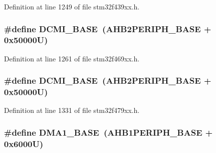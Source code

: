 Definition at line 1249 of file stm32f439xx.\+h.

\subsubsection[{\texorpdfstring{D\+C\+M\+I\+\_\+\+B\+A\+SE}{DCMI_BASE}}]{\setlength{\rightskip}{0pt plus 5cm}\#define D\+C\+M\+I\+\_\+\+B\+A\+SE~({\bf A\+H\+B2\+P\+E\+R\+I\+P\+H\+\_\+\+B\+A\+SE} + 0x50000\+U)}\hypertarget{group___peripheral__memory__map_ga55b794507e021135486de57129a2505c}{}\label{group___peripheral__memory__map_ga55b794507e021135486de57129a2505c}


Definition at line 1261 of file stm32f469xx.\+h.

\subsubsection[{\texorpdfstring{D\+C\+M\+I\+\_\+\+B\+A\+SE}{DCMI_BASE}}]{\setlength{\rightskip}{0pt plus 5cm}\#define D\+C\+M\+I\+\_\+\+B\+A\+SE~({\bf A\+H\+B2\+P\+E\+R\+I\+P\+H\+\_\+\+B\+A\+SE} + 0x50000\+U)}\hypertarget{group___peripheral__memory__map_ga55b794507e021135486de57129a2505c}{}\label{group___peripheral__memory__map_ga55b794507e021135486de57129a2505c}


Definition at line 1331 of file stm32f479xx.\+h.

\subsubsection[{\texorpdfstring{D\+M\+A1\+\_\+\+B\+A\+SE}{DMA1_BASE}}]{\setlength{\rightskip}{0pt plus 5cm}\#define D\+M\+A1\+\_\+\+B\+A\+SE~({\bf A\+H\+B1\+P\+E\+R\+I\+P\+H\+\_\+\+B\+A\+SE} + 0x6000\+U)}\hypertarget{group___peripheral__memory__map_gab2d8a917a0e4ea99a22ac6ebf279bc72}{}\label{group___peripheral__memory__map_gab2d8a917a0e4ea99a22ac6ebf279bc72}


